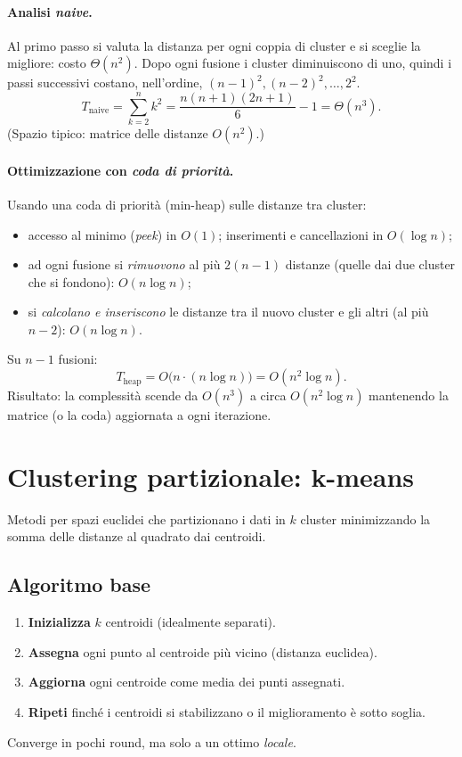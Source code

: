 \paragraph{Analisi \emph{naive}.}
Al primo passo si valuta la distanza per ogni coppia di cluster e si sceglie la migliore: costo $\Theta(n^2)$.
Dopo ogni fusione i cluster diminuiscono di uno, quindi i passi successivi costano, nell’ordine,
$(n-1)^2,(n-2)^2,\dots,2^2$.
\[
T_{\text{naive}}
=\sum_{k=2}^{n} k^{2}
=\frac{n(n+1)(2n+1)}{6}-1
=\Theta(n^{3}).
\]
(Spazio tipico: matrice delle distanze $O(n^2)$.)

\paragraph{Ottimizzazione con \emph{coda di priorità}.}
Usando una coda di priorità (min-heap) sulle distanze tra cluster:
\begin{itemize}
  \item accesso al minimo (\emph{peek}) in $O(1)$; inserimenti e cancellazioni in $O(\log n)$;
  \item ad ogni fusione si \emph{rimuovono} al più $2(n-1)$ distanze (quelle dai due cluster che si fondono): $O(n\log n)$;
  \item si \emph{calcolano e inseriscono} le distanze tra il nuovo cluster e gli altri (al più $n-2$): $O(n\log n)$.
\end{itemize}
Su $n-1$ fusioni:
\[
T_{\text{heap}}=O\big(n \cdot (n\log n)\big)=O(n^{2}\log n).
\]
Risultato: la complessità scende da $O(n^{3})$ a circa $O(n^{2}\log n)$ mantenendo la matrice (o la coda) aggiornata a ogni iterazione.


\section{Clustering partizionale: k-means}\label{sec:kmeans}
Metodi per spazi euclidei che partizionano i dati in $k$ cluster minimizzando la somma delle distanze al quadrato dai centroidi.

\subsection{Algoritmo base}\label{subsec:kmeans-basic}
\begin{enumerate}
  \item \textbf{Inizializza} $k$ centroidi (idealmente separati).
  \item \textbf{Assegna} ogni punto al centroide più vicino (distanza euclidea).
  \item \textbf{Aggiorna} ogni centroide come media dei punti assegnati.
  \item \textbf{Ripeti} finché i centroidi si stabilizzano o il miglioramento è sotto soglia.
\end{enumerate}
Converge in pochi round, ma solo a un ottimo \emph{locale}.

